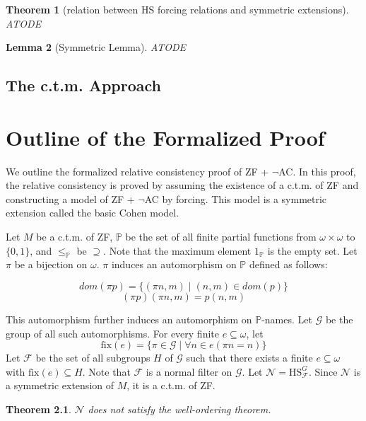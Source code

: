 \documentclass{report}
\newtheorem{thm}{Theorem}[chapter]
\newtheorem{lem}[thm]{Lemma}
\newcommand{\Pbb}{\mathbb{P}}
\newcommand{\Gcal}{\mathcal{G}}
\newcommand{\Fcal}{\mathcal{F}}
\newcommand{\Ncal}{\mathcal{N}}
\begin{document}
\begin{thm} [relation between HS forcing relations and symmetric extensions]
  ATODE
\end{thm}

\begin{lem} [Symmetric Lemma]
  ATODE
\end{lem}

\section{The c.t.m. Approach}\label{sec:ctm}

\chapter{Outline of the Formalized Proof}
We outline the formalized relative consistency proof of ZF + $\neg$AC. 
In this proof, the relative consistency is proved by assuming the existence of a c.t.m. of ZF and constructing a model of ZF + $\neg$AC by forcing. 
This model is a symmetric extension called the basic Cohen model.

Let $M$ be a c.t.m. of ZF, $\Pbb$ be the set of all finite partial functions from $\omega \times \omega$ to $\{0, 1\}$, and $\leq_{\Pbb}$ be $\supseteq$.
Note that the maximum element $1_{\Pbb}$ is the empty set. 
Let $\pi$ be a bijection on $\omega$. $\pi$ induces an automorphism on $\Pbb$ defined as follows:

$$dom(\pi p) = \{ (\pi n, m) \mid (n, m) \in dom(p) \}$$
$$(\pi p)(\pi n, m) = p(n, m)$$

This automorphism further induces an automorphism on $\Pbb$-names. 
Let $\Gcal$ be the group of all such automorphisms.
For every finite $e \subseteq \omega$, let 
$$\text{fix}(e) = \{ \pi \in \Gcal \mid \forall n \in e (\pi n = n) \}$$
Let $\Fcal$ be the set of all subgroups $H$ of $\Gcal$ such that there exists a finite $e \subseteq \omega$ with $\text{fix}(e) \subseteq H$.
Note that $\Fcal$ is a normal filter on $\Gcal$. Let $\Ncal = \text{HS}^{G}_{\Fcal}$.
Since $\Ncal$ is a symmetric extension of $M$, it is a c.t.m. of ZF. 

\begin{thm}
  $\Ncal$ does not satisfy the well-ordering theorem.
\end{thm}
\end{document}
